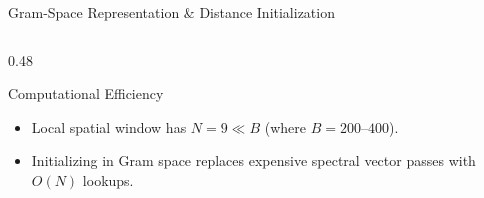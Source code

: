 \documentclass[aspectratio=169, 10pt]{beamer}
\begin{document}
\begin{frame}{Gram-Space Representation \& Distance Initialization}
\begin{columns}[T]
\begin{column}{0.48\textwidth}
      \begin{block}{Computational Efficiency}
        \footnotesize
        \begin{itemize}\setlength{\itemsep}{2pt}
          \item Local spatial window has $N = 9 \ll B$ (where $B=200\text{--}400$).
          \item Initializing in Gram space replaces expensive spectral vector passes with $O(N)$ lookups.
        \end{itemize}
      \end{block}
    \end{column}
  \end{columns}
\end{frame}

\end{document}
